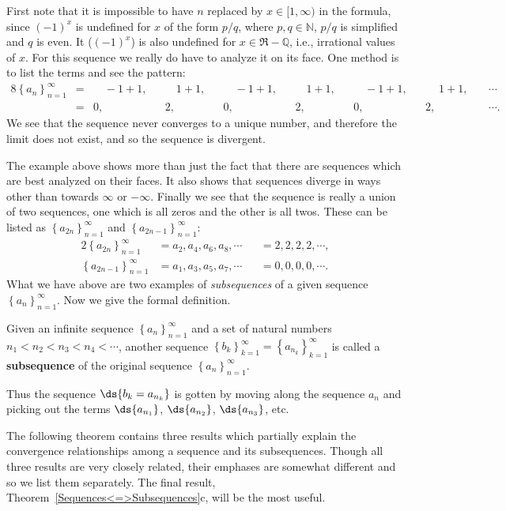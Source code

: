 First note that it is impossible to have $n$ replaced
by $x\in[1,\infty)$ in the formula, since $(-1)^x$ is undefined for
$x$ of the form $p/q$, where $p,q\in\mathbb{N}$,
$p/q$ is simplified and $q$ is even.  It ($(-1)^x$) is 
also undefined for $x\in\Re-\mathbb{Q}$, i.e., irrational
values of $x$.  For this sequence we really do have to analyze
it on its face.  One method is to list the terms and 
see the pattern:
\begin{alignat*}{8}
\left\{a_n\right\}_{n=1}^\infty
&=&\quad-1+1,&&\quad1+1,&&\quad -1+1,&&\quad 1+1,&&\quad-1+1,&&\ 
     \quad1+1,&&\ \cdots\\
&=&0,&&2,&&0,&&2,&&0,&&2,&&\ \cdots.\end{alignat*}
We see that the sequence never converges to a unique number, and
therefore the limit does not exist, and so the sequence is divergent.
\label{SeqDivByOscill--NotTalkAboutOscillSeqYet--Example}\eex

The example above shows more than just the fact that 
there are sequences which are best analyzed on their faces.
It also shows that sequences diverge in ways other than
towards $\infty$ or $-\infty$.  Finally we see that
the sequence is really a union of two sequences, one
which is all zeros and the other is all twos.
These can be listed as $\left\{a_{2n}\right\}_{n=1}^\infty$
and $\left\{a_{2n-1}\right\}_{n=1}^\infty$:
\begin{alignat*}{2}
\left\{a_{2n}\right\}_{n=1}^\infty&=a_2,a_4,a_6,a_8,\cdots&&=2,2,2,2,\cdots,\\
\left\{a_{2n-1}\right\}_{n=1}^\infty&=
    a_1,a_3,a_5,a_7,\cdots&&=0,0,0,0,\cdots.
\end{alignat*}
What we have above are two examples of {\it subsequences}
of a given sequence $\left\{a_n\right\}_{n=1}^\infty$.
Now we give the formal definition.
\begin{definition}
Given an infinite sequence $\left\{a_n\right\}_{n=1}^\infty$ and
a set of natural numbers $n_1<n_2<n_3<n_4<\cdots$, another
sequence $\left\{b_k\right\}_{k=1}^\infty=\left\{a_{n_k}\right\}_{k=1}^\infty$
is called a {\bf subsequence} of the original
sequence $\left\{a_n\right\}_{n=1}^\infty$.
\end{definition}
Thus the sequence $\ds{b_k=a_{n_k}}$ is gotten by 
moving along the sequence $a_n$ and picking out the terms
$\ds{a_{n_1}}$, $\ds{a_{n_2}}$, $\ds{a_{n_3}}$, etc.

The following theorem contains three results which
partially explain the convergence relationships among a sequence
and its subsequences.  Though all three results
are very closely related, their emphases are somewhat
different and so we list them separately.
The final result, Theorem~\ref{Sequences<=>Subsequences}c,
will be the most useful.




